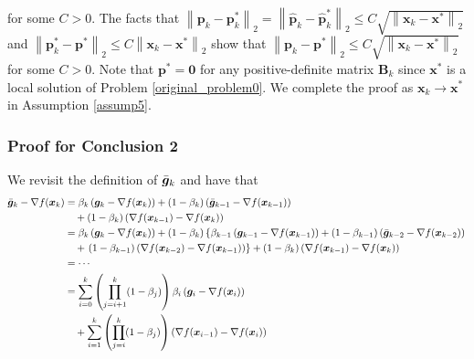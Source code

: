 \documentclass[aos]{imsart}
\numberwithin{equation}{section}
\theoremstyle{plain}
\begin{document}
\begin{appendix}
\begin{equation}
\begin{split}
        \end{split}
    \end{equation}
    for some $C > 0$. The facts that $\left \| \bm{p}_{k} - \bm{p}_{k}^{*} \right\|_2 = \left \| \hat{\bm{p}}_{k} - \hat{\bm{p}}_{k}^{*} \right\|_2 \leq C \sqrt{\left\| \bm{x}_{k} - \bm{x}^{*} \right\|_2}$ and $\left\| \bm{p}_{k}^{*} - \bm{p}^{*} \right\|_2 \leq C \left\| \bm{x}_{k} - \bm{x}^{*} \right\|_2$ show that $\left \| \bm{p}_{k} - \bm{p}^{*} \right\|_2  \leq C \sqrt{\left\| \bm{x}_{k} - \bm{x}^{*} \right\|_2}$ for some $C > 0$. Note that $\bm{p}^{*} = \bm{0}$ for any positive-definite matrix $\bm{B}_{k}$ since $\bm{x}^{*}$ is a local solution of Problem \eqref{original_problem0}. We complete the proof as $\bm{x}_{k} \to \bm{x}^{*}$ in Assumption \ref{assump5}. 

\subsubsection{Proof for Conclusion 2}
We revisit the definition of $\Bar{\bm{g}}_k$ and have that
     \begin{equation*}
        \begin{split}
            \Bar{\bm{g}}_{k} - \nabla f(\bm{x}_k) & = \beta_k \left( \bm{g}_k - \nabla f(\bm{x}_k) \right) + (1-\beta_k) \left( \Bar{\bm{g}}_{k-1} - \nabla f(\bm{x}_{k-1}) \right) \\
            & \hspace{1em} + (1-\beta_k) \left( \nabla f(\bm{x}_{k-1}) - \nabla f(\bm{x}_k) \right)\\
            & = \beta_k \left( \bm{g}_k - \nabla f(\bm{x}_k) \right) + (1-\beta_k)  \left\{ \beta_{k-1} \left( \bm{g}_{k-1} - \nabla f(\bm{x}_{k-1}) \right)  + (1-\beta_{k-1}) \left( \Bar{\bm{g}}_{k-2} - \nabla f(\bm{x}_{k-2}) \right) \right.\\
            & \hspace{1em} + \left. (1-\beta_{k-1}) \left( \nabla f(\bm{x}_{k-2}) - \nabla f(\bm{x}_{k-1}) \right) \right\} + (1-\beta_k) \left( \nabla f(\bm{x}_{k-1}) - \nabla f(\bm{x}_k) \right) \\
            & = \cdots\\
            & = \sum_{i=0}^{k} \left( \prod_{j=i+1}^{k} (1-\beta_j) \right) \beta_i \left( \bm{g}_{i} - \nabla f(\bm{x}_{i}) \right) \\
            & \hspace{1em} + \sum_{i=1}^{k} \left( \prod_{j=i}^{k} (1-\beta_j) \right) \left( \nabla f(\bm{x}_{i-1}) - \nabla f(\bm{x}_{i}) \right) \\

\end{split}
\end{equation*}
\end{appendix}
\end{document}
